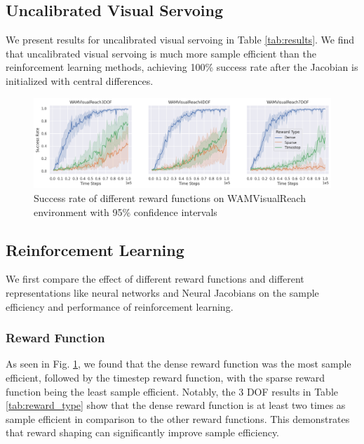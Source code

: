 \documentclass[letterpaper, 10 pt, conference]{ieeeconf}  %
\begin{document}
\subsection{Uncalibrated Visual Servoing}

We present results for uncalibrated visual servoing in Table \ref{tab:results}. We find that uncalibrated visual servoing is
much more sample efficient than the reinforcement learning methods, achieving
100\% success rate after the Jacobian is initialized with central differences.

\begin{figure}[thpb]
    \centering
    \includegraphics[width=\linewidth]{successes.reward_type.timesteps.png}
    \caption{Success rate of different reward functions on WAMVisualReach environment with 95\% confidence intervals}
    \label{fig:figure_reward_functions}
\end{figure}

\subsection{Reinforcement Learning}

We first compare the effect of different reward functions and
different representations like neural networks and Neural Jacobians
on the sample efficiency and performance of reinforcement learning.


\subsubsection{Reward Function}

As seen in Fig. \ref{fig:figure_reward_functions}, we found that the dense
reward function was the most sample efficient, followed by the timestep reward
function, with the sparse reward function being the least sample efficient.
Notably, the 3 DOF results in Table \ref{tab:reward_type} show that the dense
reward function is at least two times as sample efficient in comparison to the
other reward functions. This demonstrates that reward shaping can significantly
improve sample efficiency.
\end{document}
